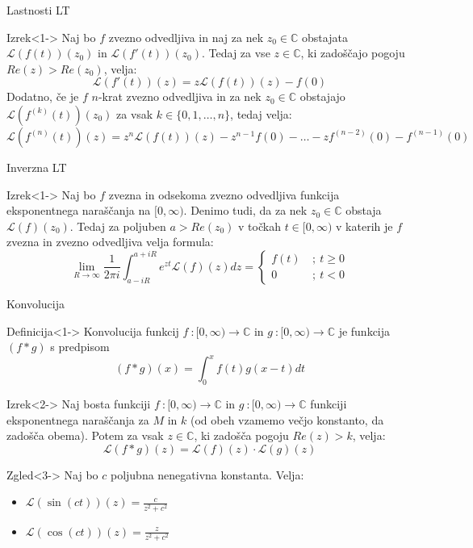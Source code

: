 \documentclass[t, 8pt]{beamer} %
\newcommand{\mth}[1]{\ensuremath{\mathbb{#1}}}
\newcommand{\C}{\mth{C}}
\newcommand{\map}[3]{\ensuremath{{#1}~: {#2} \rightarrow {#3}}}
\begin{document}
		\begin{frame}{Lastnosti LT}
			\begin{block}{Izrek}<1->
				Naj bo $f$ zvezno odvedljiva in naj za nek $z_0\in\C$ obstajata $\mathcal{L}(f(t))(z_0)$ in $\mathcal{L}(f'(t))(z_0)$. Tedaj za vse $z\in\C$, ki zadoščajo pogoju $Re(z) > Re(z_0)$, velja: $$\mathcal{L}(f'(t))(z) = z\mathcal{L}(f(t))(z) - f(0)$$
				Dodatno, če je $f$ $n$-krat zvezno odvedljiva in za nek $z_0\in\C$ obstajajo $\mathcal{L}(f^{(k)}(t))(z_0)$ za vsak $k\in\{0, 1, \ldots, n\}$, tedaj velja: $$\mathcal{L}(f^{(n)}(t))(z) = z^n\mathcal{L}(f(t))(z) - z^{n-1}f(0) - \ldots -zf^{(n-2)}(0) -  f^{(n-1)}(0)$$
			\end{block}
		\end{frame}
		
		\begin{frame}{Inverzna LT}
			\begin{block}{Izrek}<1->
				Naj bo $f$ zvezna in odsekoma zvezno odvedljiva funkcija eksponentnega naraščanja na $[0, \infty)$. Denimo tudi, da za nek $z_0\in\C$ obstaja $\mathcal{L}(f)(z_0)$. Tedaj za poljuben $a>Re(z_0)$ v točkah $t \in [0, \infty)$ v katerih je $f$ zvezna in zvezno odvedljiva velja formula: $$\lim_{R\to\infty}\frac{1}{2\pi i}\int_{a-iR}^{a+iR}e^{zt}\mathcal{L}(f)(z)dz = \begin{cases}
					f(t)~&;~ t\geq 0 \\
					0~&;~ t < 0
				\end{cases}$$
			\end{block}
		\end{frame}
		
		\begin{frame}{Konvolucija}
			\begin{block}{Definicija}<1->
				Konvolucija funkcij $\map{f}{[0,\infty)}{\C}$ in $\map{g}{[0,\infty)}{\C}$ je funkcija $(f*g)$ s predpisom $$(f*g)(x) = \int_{0}^{x} f(t)g(x-t)dt$$
			\end{block}
			\begin{block}{Izrek}<2->
				Naj bosta funkciji $\map{f}{[0,\infty)}{\C}$ in $\map{g}{[0,\infty)}{\C}$ funkciji eksponentnega naraščanja za $M$ in $k$ (od obeh vzamemo večjo konstanto, da zadošča obema). Potem za vsak $z\in\C$, ki zadošča pogoju $Re(z) > k$, velja: $$\mathcal{L}(f*g)(z) = \mathcal{L}(f)(z)\cdot\mathcal{L}(g)(z)$$
			\end{block}
			\begin{block}{Zgled}<3->
				Naj bo $c$ poljubna nenegativna konstanta. Velja: \begin{itemize}
					\item $\mathcal{L}(\sin(ct))(z) = \frac{c}{z^2 + c^2}$
					\item $\mathcal{L}(\cos(ct))(z) = \frac{z}{z^2 + c^2}$
				\end{itemize}
			\end{block}
		\end{frame}
		
\end{document}

